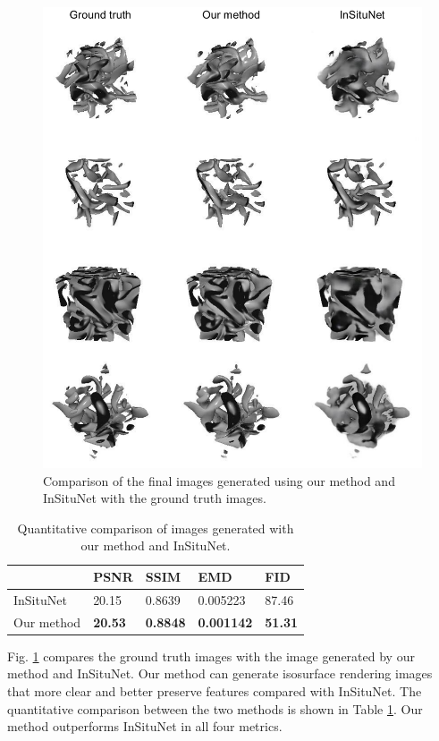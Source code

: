 \documentclass[journal]{vgtc}                %
\begin{document}
\begin{figure}
  \centering
  \includegraphics[width=1\linewidth]{baseline}
  \caption{Comparison of the final images generated using our method and InSituNet with the ground truth images. }
  \label{fig:baseline}
\end{figure}

\begin{table}
\caption{Quantitative comparison of images generated with our method and InSituNet. }
    \centering
    \begin{tabular}{l|l|l|l|l}
         & PSNR & SSIM & EMD & FID \\  \hline
         InSituNet & 20.15 & 0.8639 & 0.005223 & 87.46   \\ \hline
         Our method & \textbf{20.53} & \textbf{0.8848} & \textbf{0.001142} & \textbf{51.31}  \\ 
    \end{tabular}
    \label{table:baseline}
\end{table}

Fig. \ref{fig:baseline} compares the ground truth images with the image generated by our method and InSituNet. Our method can generate isosurface rendering images that more clear and better preserve features compared with InSituNet. The quantitative comparison between the two methods is shown in Table \ref{table:baseline}. Our method outperforms InSituNet in all four metrics. 
\end{document}
